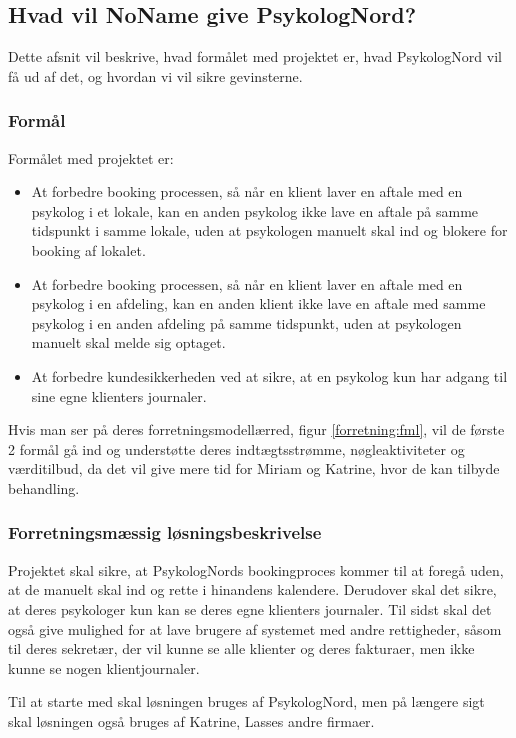\subsection{Hvad vil NoName give PsykologNord?}
Dette afsnit vil beskrive, hvad formålet med projektet er, hvad PsykologNord vil få ud af det, og hvordan vi vil sikre gevinsterne.

\subsubsection{Formål}
Formålet med projektet er:

\begin{itemize}
    \item At forbedre booking processen, så når en klient laver en aftale med en psykolog i et lokale, kan en anden psykolog ikke lave en aftale på samme tidspunkt i samme lokale, uden at psykologen manuelt skal ind og blokere for booking af lokalet.
    \item At forbedre booking processen, så når en klient laver en aftale med en psykolog i en afdeling, kan en anden klient ikke lave en aftale med samme psykolog i en anden afdeling på samme tidspunkt, uden at psykologen manuelt skal melde sig optaget.
    \item At forbedre kundesikkerheden ved at sikre, at en psykolog kun har adgang til sine egne klienters journaler.
\end{itemize}

Hvis man ser på deres forretningsmodellærred, figur \ref{forretning:fml}, vil de første 2 formål gå ind og understøtte deres indtægtsstrømme, nøgleaktiviteter og værditilbud, da det vil give mere tid for Miriam og Katrine, hvor de kan tilbyde behandling.
\subsubsection{Forretningsmæssig løsningsbeskrivelse}

Projektet skal sikre, at PsykologNords bookingproces kommer til at foregå uden, at de manuelt skal ind og rette i hinandens kalendere.
Derudover skal det sikre, at deres psykologer kun kan se deres egne klienters journaler. 
Til sidst skal det også give mulighed for at lave brugere af systemet med andre rettigheder, såsom til deres sekretær, der vil kunne se alle klienter og deres fakturaer, men ikke kunne se nogen klientjournaler.

Til at starte med skal løsningen bruges af PsykologNord, men på længere sigt skal løsningen også bruges af Katrine, Lasses andre firmaer.

